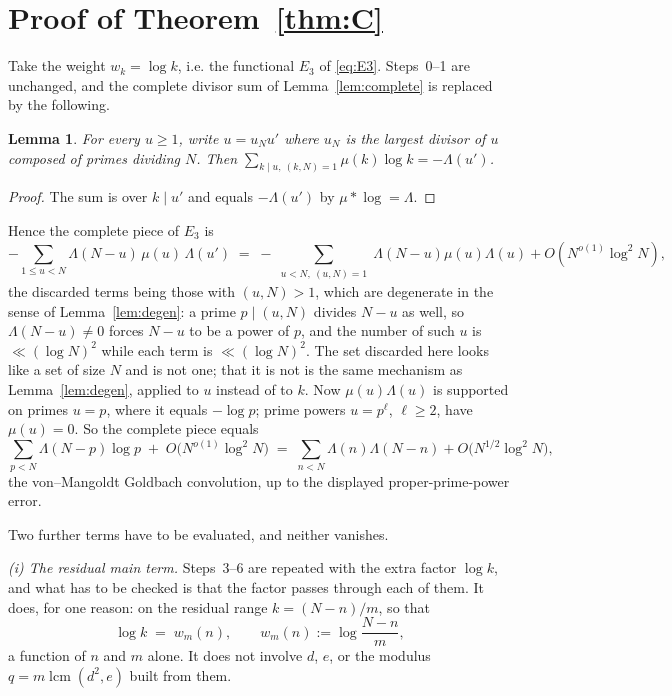 \documentclass[11pt,a4paper]{article}
\theoremstyle{plain}
\newtheorem{lemma}[theorem]{Lemma}
\theoremstyle{definition}
\theoremstyle{remark}
\DeclareMathOperator{\lcm}{lcm}
\begin{document}
\section{Proof of \texorpdfstring{Theorem~\ref{thm:C}}{the residual relation}}
\label{sec:C}

Take the weight $w_k=\log k$, i.e. the functional $E_3$ of
\eqref{eq:E3}. Steps~0--1 are unchanged, and the complete divisor sum
of Lemma~\ref{lem:complete} is replaced by the following.

\begin{lemma}\label{lem:completelog}
For every $u\ge1$, write $u=u_Nu'$ where $u_N$ is the largest divisor
of $u$ composed of primes dividing $N$. Then
$\sum_{k\mid u,\ (k,N)=1}\mu(k)\log k=-\Lambda(u')$.
\end{lemma}

\begin{proof}
The sum is over $k\mid u'$ and equals $-\Lambda(u')$ by
$\mu*\log=\Lambda$.
\end{proof}

Hence the complete piece of $E_3$ is
\[
  -\sum_{1\le u<N}\Lambda(N-u)\,\mu(u)\,\Lambda(u')
  \;=\;-\sum_{\substack{u<N,\ (u,N)=1}}\Lambda(N-u)\mu(u)\Lambda(u)
        +O(N^{o(1)}\log^2 N),
\]
the discarded terms being those with $(u,N)>1$, which are degenerate in
the sense of Lemma~\ref{lem:degen}: a prime $p\mid(u,N)$ divides $N-u$
as well, so $\Lambda(N-u)\ne0$ forces $N-u$ to be a power of $p$, and
the number of such $u$ is $\ll(\log N)^2$ while each term is
$\ll(\log N)^2$. The set discarded here looks like a set of size $N$
and is not one; that it is not is the same mechanism as
Lemma~\ref{lem:degen}, applied to $u$ instead of to $k$.
Now $\mu(u)\Lambda(u)$ is supported on primes $u=p$, where it equals
$-\log p$; prime powers $u=p^\ell$, $\ell\ge2$, have $\mu(u)=0$. So
the complete piece equals
\begin{equation}\label{eq:goldbachback}
  \sum_{p<N}\Lambda(N-p)\log p\;+\;O\bigl(N^{o(1)}\log^2N\bigr)
  \;=\;\sum_{n<N}\Lambda(n)\Lambda(N-n)
       +O\bigl(N^{1/2}\log^2N\bigr),
\end{equation}
the von--Mangoldt Goldbach convolution, up to the displayed
proper-prime-power error.

Two further terms have to be evaluated, and neither vanishes.

\medskip\noindent
\emph{(i) The residual main term.} Steps~3--6 are repeated with the
extra factor $\log k$, and what has to be checked is that the factor
passes through each of them. It does, for one reason: on the residual
range $k=(N-n)/m$, so that
\begin{equation}\label{eq:logweight}
  \log k\;=\;w_m(n),\qquad w_m(n):=\log\frac{N-n}{m},
\end{equation}
a function of $n$ and $m$ alone. It does not involve $d$, $e$, or the
modulus $q=m\lcm(d^2,e)$ built from them.
\end{document}
